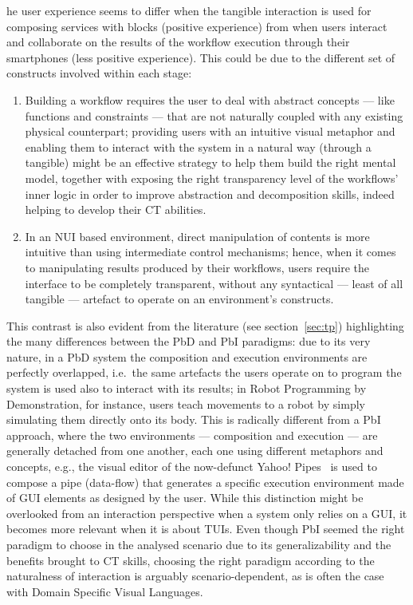 he user experience seems to differ when the tangible interaction is used for composing services with blocks (positive experience) from when users interact and collaborate on the results of the workflow execution through their smartphones (less positive experience). This could be due to the different set of constructs involved within each stage:
\begin{enumerate}
  \item Building a workflow requires the user to deal with abstract concepts --- like functions and constraints --- that are not naturally coupled with any existing physical counterpart; providing users with an intuitive visual metaphor and enabling them to interact with the system in a natural way (through a tangible) might be an effective strategy to help them build the right mental model, together with exposing the right transparency level of the workflows' inner logic in order to improve abstraction and decomposition skills, indeed helping to develop their \ac{CT} abilities.
  \item In an \ac{NUI} based environment, direct manipulation of contents is more intuitive than using intermediate control mechanisms; hence, when it comes to manipulating results produced by their workflows, users require the interface to be completely transparent, without any syntactical --- least of all tangible --- artefact to operate on an environment's constructs. 
\end{enumerate}

This contrast is also evident from the literature (see section~\ref{sec:tp}) highlighting the many differences between the \ac{PbD} and \ac{PbI} paradigms: due to its very nature, in a \ac{PbD} system the composition and execution environments are perfectly overlapped, i.e.\ the same artefacts the users operate on to program the system is used also to interact with its results; in Robot Programming by Demonstration, for instance, users teach movements to a robot by simply simulating them directly onto its body. This is radically different from a \ac{PbI} approach, where the two environments --- composition and execution --- are generally detached from one another, each one using different metaphors and concepts, e.g., the visual editor of the now-defunct Yahoo! Pipes~\cite{Pruett:2007:YP:1407887} is used to compose a pipe (data-flow) that generates a specific execution environment made of \ac{GUI} elements as designed by the user. While this distinction might be overlooked from an interaction perspective when a system only relies on a \ac{GUI}, it becomes more relevant when it is about \acp{TUI}. Even though \ac{PbI} seemed the right paradigm to choose in the analysed scenario due to its generalizability and the benefits brought to \ac{CT} skills, choosing the right paradigm according to the naturalness of interaction is arguably scenario-dependent, as is often the case with Domain Specific Visual Languages.

